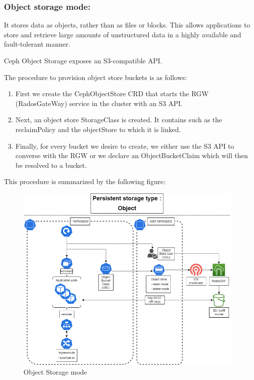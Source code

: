 \subsubsection{Object storage mode: }

It stores data as objects, rather than as files or blocks. This allows applications to store and retrieve large amounts of unstructured data in a highly available and fault-tolerant manner. 

Ceph Object Storage exposes an S3-compatible API. 

The procedure to provision object store buckets is as follows: 

\begin{enumerate}[label = (\arabic*)]
    \item First we create the CephObjectStore CRD that starts the RGW (RadosGateWay) service in the cluster with an S3 API. 
    \item Next, an object store StorageClass is created. It contains such as the reclaimPolicy and the objectStore to which it is linked. 
    \item Finally, for every bucket we desire to create, we either use the S3 API to converse with the RGW or we declare an ObjectBucketClaim which will then be resolved to a bucket. 
\end{enumerate}


This procedure is summarized by the following figure: 

\begin{figure}[H]\centering
\includegraphics[width=1.0\textwidth,angle=00]{assets/f32.png}
\caption{Object Storage mode }
\label{fig:Object Storage mode}
\end{figure}


